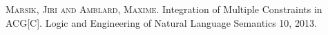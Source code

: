 
\begin{publications}{99}

    \item\textsc{Marsik, Jiri and Amblard, Maxime}. {Integration of Multiple Constraints in ACG}[C].
      Logic and Engineering of Natural Language Semantics 10, 2013.

\end{publications}
